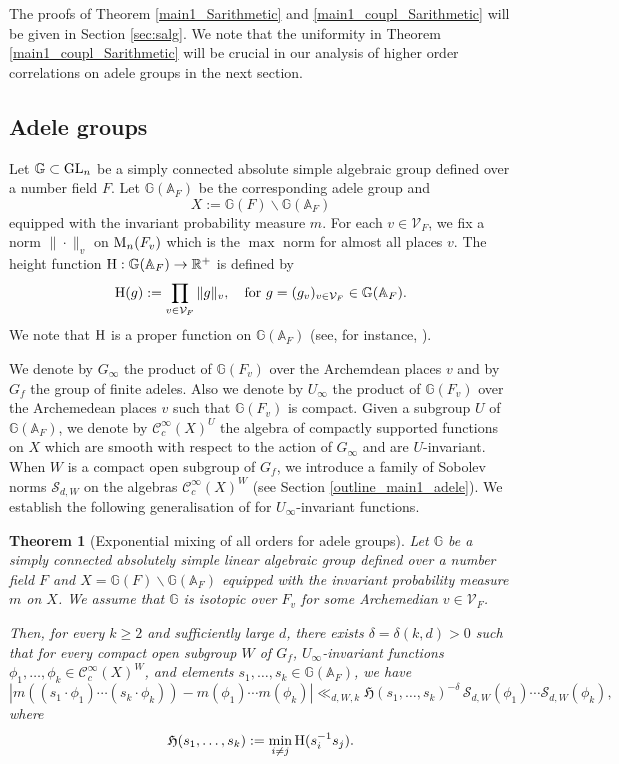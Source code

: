 \documentclass[11pt,reqno,a4paper]{amsart}
\numberwithin{equation}{section}
\newcommand{\cC}{\mathcal{C}}
\newcommand{\cS}{\mathcal{S}}
\newcommand{\bA}{\mathbb{A}}
\newcommand{\bG}{\mathbb{G}}
\theoremstyle{theorem}
\newtheorem{theorem}{Theorem}[section]
\theoremstyle{definition}
\begin{document}
The proofs of Theorem \ref{main1_Sarithmetic} and \ref{main1_coupl_Sarithmetic} will be given in Section \ref{sec:salg}. We note that the uniformity in Theorem \ref{main1_coupl_Sarithmetic}
will be crucial in our analysis of higher order correlations on adele groups 
in the next section.


\subsection{Adele groups}

Let $\bG\subset \hbox{GL}_n$ be a simply connected absolute simple algebraic group defined over a number field $F$. Let $\bG(\bA_F)$ be the corresponding adele group
and 
$$
X:=\bG(F)\backslash\bG(\bA_F)
$$
equipped with the invariant probability measure $m$.
For each $v\in \mathcal{V}_F$, we fix a norm $\|\cdot \|_v$ on $\hbox{M}_n(F_v)$
which is the $\max$ norm for almost all places $v$. 
The height function $\hbox{H}: \bG(\bA_F)\to \mathbb{R}^+$ is defined by
\begin{equation}
\label{eq:HHH}
\hbox{H}(g):=\prod_{v\in\mathcal{V}_F} \|g\|_v, \quad \hbox{for $g=(g_v)_{v\in\mathcal{V}_F}\in \bG(\bA_F)$}.
\end{equation}
We note that $\hbox{H}$ is a proper function on $\bG(\bA_F)$ (see, for instance, \cite[Lemma~2.5]{GMO}).

We denote by $G_\infty$ the product of $\bG(F_v)$ over the Archemdean places $v$ and 
by $G_f$ the group of finite adeles. Also 
we denote by $U_\infty$ 
the product of $\bG(F_v)$ over the Archemedean places $v$ such that 
$\bG(F_v)$ is compact.
Given a subgroup $U$ of $\bG(\bA_F)$, we denote by $\cC_c^\infty(X)^U$
the algebra of compactly supported functions on $X$ which are smooth with respect to the action of $G_\infty$ and are $U$-invariant. When $W$ is a compact open subgroup of $G_f$,
we introduce a family of Sobolev norms $\cS_{d,W}$ on the algebras $\cC_c^\infty(X)^W$
(see Section \ref{outline_main1_adele}).
We establish the following generalisation of \cite[Theorem~3.27]{GMO}
for $U_\infty$-invariant functions.


\begin{theorem}[Exponential mixing of all orders for adele groups]
\label{main2}
Let $\bG$ be a simply connected absolutely simple linear algebraic group defined over 
a number field $F$  and $X = \bG(F) \backslash \bG(\bA_F)$
equipped with the invariant probability measure $m$ on $X$.
We assume that $\bG$ is isotopic over $F_v$ for some Archemedian $v\in\mathcal{V}_F$.

Then, for every $k \geq 2$ and sufficiently large $d$, there exists $\delta=\delta(k,d) > 0$ such
that for every compact open subgroup $W$ of $G_f$, $U_\infty$-invariant functions $\phi_1, \ldots, \phi_k \in \cC^\infty_c(X)^{W}$, and elements $s_1,\ldots,s_k \in \bG(\bA_F)$,
we have
\[
| m((s_1 \cdot \phi_1) \cdots (s_k \cdot \phi_k)) - m(\phi_1) \cdots m(\phi_k) |
\ll_{d,W,k}
\mathfrak{H}(s_1,\ldots,s_k)^{-\delta} \, \cS_{d,W}(\phi_1) \cdots \cS_{d,W}(\phi_k),
\]
where 
$$
\mathfrak{H}(s_1,\ldots,s_k):=\min_{i\ne j} \hbox{\rm H}(s_i^{-1} s_j).
$$
\end{theorem}
\end{document}
